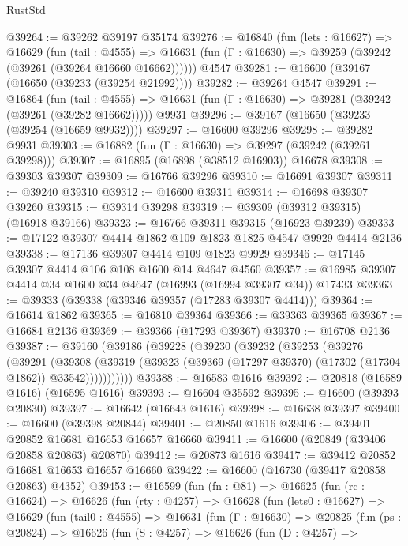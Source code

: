 \begin{lexlean}{RustStd}
\begin{coremodule}
@39264 := @39262 @39197 @35174
@39276 := @16840
    (fun (lets : @16627) =>
    @16629
      (fun (tail : @4555) =>
      @16631 (fun (Γ : @16630) => @39259 (@39242 (@39261 (@39264 @16660 @16662))))))
    @4547
@39281 := @16600 (@39167 (@16650 (@39233 (@39254 @21992))))
@39282 := @39264 @4547
@39291 := @16864
    (fun (tail : @4555) => @16631 (fun (Γ : @16630) => @39281 (@39242 (@39261 (@39282 @16662)))))
    @9931
@39296 := @39167 (@16650 (@39233 (@39254 (@16659 @9932))))
@39297 := @16600 @39296
@39298 := @39282 @9931
@39303 := @16882 (fun (Γ : @16630) => @39297 (@39242 (@39261 @39298)))
@39307 := @16895 (@16898 (@38512 @16903)) @16678
@39308 := @39303 @39307
@39309 := @16766 @39296
@39310 := @16691 @39307
@39311 := @39240 @39310
@39312 := @16600 @39311
@39314 := @16698 @39307 @39260
@39315 := @39314 @39298
@39319 := @39309 (@39312 @39315) (@16918 @39166)
@39323 := @16766 @39311 @39315 (@16923 @39239)
@39333 := @17122 @39307 @4414 @1862 @109 @1823 @1825 @4547 @9929 @4414 @2136
@39338 := @17136 @39307 @4414 @109 @1823 @9929
@39346 := @17145 @39307 @4414 @106 @108 @1600 @14 @4647 @4560
@39357 := @16985 @39307 @4414 @34 @1600 @34 @4647 (@16993 (@16994 @39307 @34)) @17433
@39363 := @39333 (@39338 (@39346 @39357 (@17283 @39307 @4414)))
@39364 := @16614 @1862
@39365 := @16810 @39364
@39366 := @39363 @39365
@39367 := @16684 @2136
@39369 := @39366 (@17293 @39367)
@39370 := @16708 @2136
@39387 := @39160
    (@39186
      (@39228
        (@39230
          (@39232
            (@39253
              (@39276
                (@39291
                  (@39308
                    (@39319
                      (@39323 (@39369 (@17297 @39370) (@17302 (@17304 @1862)) @33542)))))))))))
@39388 := @16583 @1616
@39392 := @20818 (@16589 @1616) (@16595 @1616)
@39393 := @16604 @35592
@39395 := @16600 (@39393 @20830)
@39397 := @16642 (@16643 @1616)
@39398 := @16638 @39397
@39400 := @16600 (@39398 @20844)
@39401 := @20850 @1616
@39406 := @39401 @20852 @16681 @16653 @16657 @16660
@39411 := @16600 (@20849 (@39406 @20858 @20863) @20870)
@39412 := @20873 @1616
@39417 := @39412 @20852 @16681 @16653 @16657 @16660
@39422 := @16600 (@16730 (@39417 @20858 @20863) @4352)
@39453 := @16599
    (fun (fn : @81) =>
    @16625
      (fun (rc : @16624) =>
      @16626
        (fun (rty : @4257) =>
        @16628
          (fun (lets0 : @16627) =>
          @16629
            (fun (tail0 : @4555) =>
            @16631
              (fun (Γ : @16630) =>
              @20825
                (fun (ps : @20824) =>
                @16626
                  (fun (S : @4257) =>
                  @16626
                    (fun (D : @4257) =>

\end{coremodule}
\end{lexlean}
